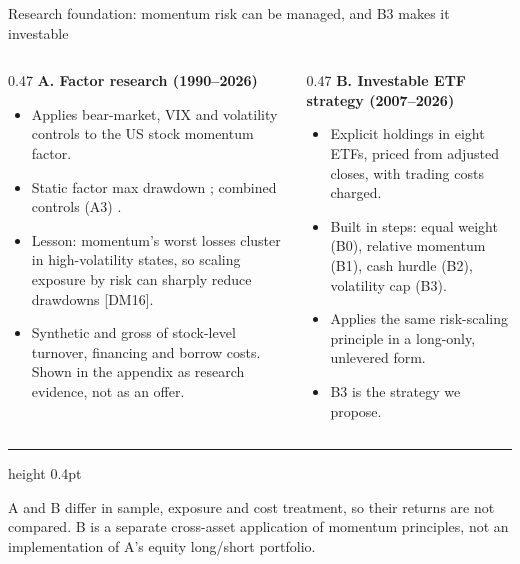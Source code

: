 \documentclass[aspectratio=169,11pt]{beamer}
\newcommand{\rcite}[1]{{\color{muted}[#1]}}
\begin{document}
\begin{frame}[t]{Research foundation: momentum risk can be managed, and B3 makes it investable}
\begin{columns}[T,onlytextwidth]
\begin{column}{0.47\textwidth}
\small\textbf{\color{accent}A. Factor research (1990--2026)}
\footnotesize
\begin{itemize}\itemsep2pt
\item Applies bear-market, VIX and volatility controls to the US stock momentum factor.
\item Static factor max drawdown \AzeroMDD; combined controls (A3) \AthreeMDD.
\item Lesson: momentum's worst losses cluster in high-volatility states, so scaling exposure by risk can sharply reduce drawdowns \rcite{DM16}.
\item Synthetic and gross of stock-level turnover, financing and borrow costs. Shown in the appendix as research evidence, not as an offer.
\end{itemize}
\end{column}
\begin{column}{0.47\textwidth}
\small\textbf{\color{accent}B. Investable ETF strategy (2007--2026)}
\footnotesize
\begin{itemize}\itemsep2pt
\item Explicit holdings in eight ETFs, priced from adjusted closes, with trading costs charged.
\item Built in steps: equal weight (B0), relative momentum (B1), cash hurdle (B2), volatility cap (B3).
\item Applies the same risk-scaling principle in a long-only, unlevered form.
\item B3 is the strategy we propose.
\end{itemize}
\end{column}
\end{columns}
\vskip0.3cm
{\color{accent!40}\hrule height 0.4pt}
\vskip0.12cm
\footnotesize\color{muted}A and B differ in sample, exposure and cost treatment, so their returns are not compared. B is a separate cross-asset application of momentum principles, not an implementation of A's equity long/short portfolio.
\end{frame}
\end{document}
